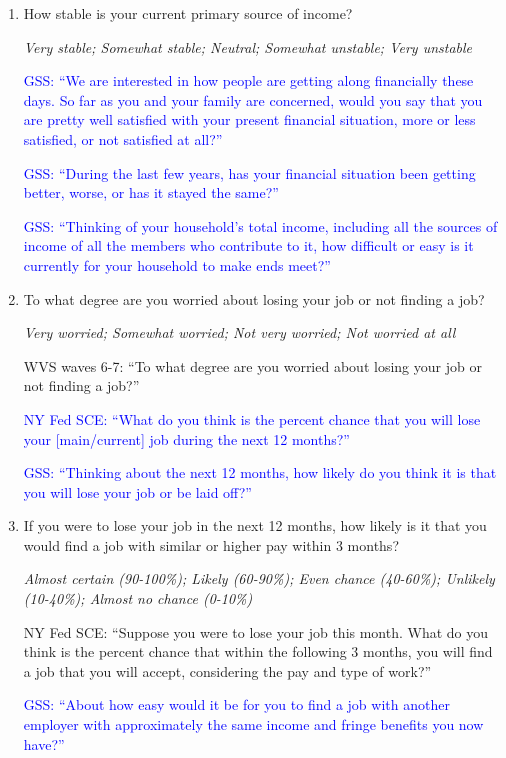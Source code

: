 \documentclass[11pt, headsepline]{article}
\newcommand{\blue}[1]{\textcolor{blue}{#1}}
\newcommand{\green}[1]{\textcolor{sharpgreen}{#1}}
\begin{document}
\begin{enumerate}[resume]

    \item How stable is your current primary source of income?

    \textit{Very stable; Somewhat stable; Neutral; Somewhat unstable; Very unstable}

    \blue{GSS: ``We are interested in how people are getting along financially these days. So far as you and your family are concerned, would you say that you are pretty well satisfied with your present financial situation, more or less satisfied, or not satisfied at all?''}

    \blue{GSS: ``During the last few years, has your financial situation been getting better, worse, or has it stayed the same?''}

    \blue{GSS: ``Thinking of your household's total income, including all the sources of income of all the members who contribute to it, how difficult or easy is it currently for your household to make ends meet?''}

    \item To what degree are you worried about losing your job or not finding a job?

    \textit{Very worried; Somewhat worried; Not very worried; Not worried at all}

    \green{WVS waves 6-7: ``To what degree are you worried about losing your job or not finding a job?''}

    \blue{NY Fed SCE: ``What do you think is the percent chance that you will lose your [main/current] job during the next 12 months?''}

    \blue{GSS: ``Thinking about the next 12 months, how likely do you think it is that you will lose your job or be laid off?''}

    \item If you were to lose your job in the next 12 months, how likely is it that you would find a job with similar or higher pay within 3 months?

    \textit{Almost certain (90-100\%); Likely (60-90\%); Even chance (40-60\%); Unlikely (10-40\%); Almost no chance (0-10\%)}

    \green{NY Fed SCE: ``Suppose you were to lose your job this month. What do you think is the percent chance that within the following 3 months, you will find a job that you will accept, considering the pay and type of work?''}

    \blue{GSS: ``About how easy would it be for you to find a job with another employer with approximately the same income and fringe benefits you now have?''}


\end{enumerate}
\end{document}
